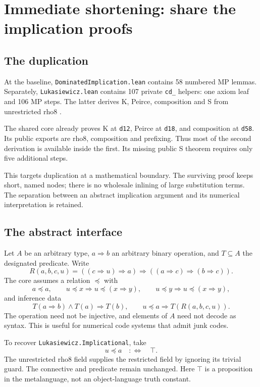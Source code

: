 \documentclass[11pt,letterpaper]{article}
\newcommand{\below}{\preccurlyeq}
\newcommand{\code}[1]{\texttt{#1}}
\begin{document}
\section{Immediate shortening: share the implication proofs}
\label{sec:sharing}

\subsection{The duplication}

At the baseline, \code{DominatedImplication.lean} contains 58 numbered MP lemmas.
Separately, \code{Lukasiewicz.lean} contains 107 private \code{cd\_} helpers:
one axiom leaf and 106 MP steps. The latter derives K, Peirce, composition and S
from unrestricted rho8 \cite{core,lukasiewicz}.

The shared core already proves K at \code{d12}, Peirce at \code{d18}, and
composition at \code{d58}. Its public exports are rho8, composition and prefixing.
Thus most of the second derivation is available inside the first. Its missing
public S theorem requires only five additional steps.

This targets duplication at a mathematical boundary. The surviving proof keeps
short, named nodes; there is no wholesale inlining of large substitution terms.
The separation between an abstract implication argument and its numerical
interpretation is retained.

\subsection{The abstract interface}

Let \(A\) be an arbitrary type, \(a\Rightarrow b\) an arbitrary binary operation,
and \(T\subseteq A\) the designated predicate. Write
\[
 R(a,b,c,u)=((c\Rightarrow u)\Rightarrow a)
 \Rightarrow((a\Rightarrow c)\Rightarrow(b\Rightarrow c)).
\]
The core assumes a relation \(\below\) with
\[
 a\below a,\qquad
 u\below x\Longrightarrow u\below(x\Rightarrow y),\qquad
 u\below y\Longrightarrow u\below(x\Rightarrow y),
\]
and inference data
\[
 T(a\Rightarrow b)\land T(a)\Longrightarrow T(b),
 \qquad
 u\below a\Longrightarrow T(R(a,b,c,u)).
\]
The operation need not be injective, and elements of \(A\) need not decode as
syntax. This is useful for numerical code systems that admit junk codes.

To recover \code{Lukasiewicz.Implicational}, take
\[
 u\below a\quad:\Longleftrightarrow\quad\top.
\]
The unrestricted rho8 field supplies the restricted field by ignoring its
trivial guard. The connective and predicate remain unchanged. Here \(\top\)
is a proposition in the metalanguage, not an object-language truth constant.
\end{document}
